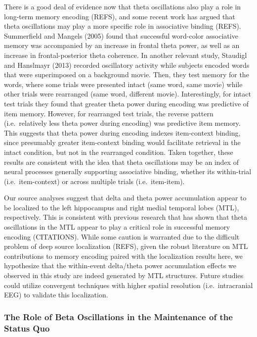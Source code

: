 There is a good deal of evidence now that theta oscillations also play a
role in long-term memory encoding (REFS), and some recent work has
argued that theta oscillations may play a more specific role in
associative binding (REFS). Summerfield and Mangels (2005) found that
successful word-color associative memory was accompanied by an increase
in frontal theta power, as well as an increase in frontal-posterior
theta coherence. In another relevant study, Staudigl and Hanslmayr
(2013) recorded oscillatory activity while subjects encoded words that
were superimposed on a background movie. Then, they test memory for the
words, where some trials were presented intact (same word, same movie)
while other trials were rearranged (same word, different movie).
Interestingly, for intact test trials they found that greater theta
power during encoding was predictive of item memory. However, for
rearranged test trials, the reverse pattern (i.e.~relatively less theta
power during encoding) was predictive item memory. This suggests that
theta power during encoding indexes item-context binding, since
presumably greater item-context binding would facilitate retrieval in
the intact condition, but not in the rearranged condition. Taken
together, these results are consistent with the idea that theta
oscillations may be an index of neural processes generally supporting
associative binding, whether its within-trial (i.e.~item-context) or
across multiple trials (i.e.~item-item).

Our source analyses suggest that delta and theta power accumulation
appear to be localized to the left hippocampus and right medial temporal
lobes (MTL), respectively. This is consistent with previous research
that has shown that theta oscillations in the MTL appear to play a
critical role in successful memory encoding (CITATIONS). While some
caution is warranted due to the difficult problem of deep source
localization (REFS), given the robust literature on MTL contributions to
memory encoding paired with the localization results here, we
hypothesize that the within-event delta/theta power accumulation effects
we observed in this study are indeed generated by MTL structures. Future
studies could utilize convergent techniques with higher spatial
resolution (i.e.~intracranial EEG) to validate this localization.

\subsubsection{The Role of Beta Oscillations in the Maintenance of the
Status
Quo}\label{the-role-of-beta-oscillations-in-the-maintenance-of-the-status-quo}

